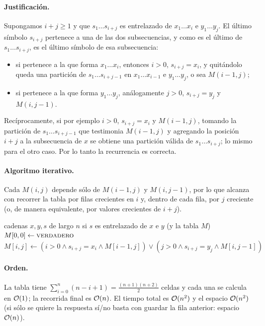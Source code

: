 \paragraph{Justificación.} Supongamos $i+j\ge 1$ y que $s_1\dots s_{i+j}$ es entrelazado de
$x_1\dots x_i$ e $y_1\dots y_j$. El último símbolo $s_{i+j}$ pertenece a una de las dos subsecuencias, y
como es el último de $s_1\dots s_{i+j}$, es el último símbolo de esa subsecuencia:
\begin{itemize}
\item si pertenece a la que forma $x_1\dots x_i$, entonces $i>0$, $s_{i+j}=x_i$, y quitándolo queda una
  partición de $s_1\dots s_{i+j-1}$ en $x_1\dots x_{i-1}$ e $y_1\dots y_j$, o sea $M(i-1,j)$;
\item si pertenece a la que forma $y_1\dots y_j$, análogamente $j>0$, $s_{i+j}=y_j$ y $M(i,j-1)$.
\end{itemize}
Recíprocamente, si por ejemplo $i>0$, $s_{i+j}=x_i$ y $M(i-1,j)$, tomando la partición de
$s_1\dots s_{i+j-1}$ que testimonia $M(i-1,j)$ y agregando la posición $i+j$ a la subsecuencia de $x$ se
obtiene una partición válida de $s_1\dots s_{i+j}$; lo mismo para el otro caso. Por lo tanto la
recurrencia es correcta.

\paragraph{Algoritmo iterativo.} Cada $M(i,j)$ depende sólo de $M(i-1,j)$ y $M(i,j-1)$, por lo que alcanza
con recorrer la tabla por filas crecientes en $i$ y, dentro de cada fila, por $j$ creciente (o, de manera
equivalente, por valores crecientes de $i+j$).

\begin{algorithm}[H]
\caption{Entrelazado$(x,y,s)$}
\begin{algorithmic}[1]
\Require cadenas $x,y,s$ de largo $n$
\Ensure \True{} si $s$ es entrelazado de $x$ e $y$ (y la tabla $M$)
\State $M[0,0] \gets \textsc{verdadero}$
      \State $M[i,j] \gets (i>0 \wedge s_{i+j}=x_i \wedge M[i-1,j]) \vee (j>0 \wedge s_{i+j}=y_j \wedge M[i,j-1])$
    \EndIf
  \EndFor
\EndFor
{}
   \Return \True \EndIf
\EndFor
\State \Return \False
\end{algorithmic}
\end{algorithm}

\paragraph{Orden.} La tabla tiene $\sum_{i=0}^n (n-i+1) = \frac{(n+1)(n+2)}{2}$ celdas y cada una se calcula
en $\mathcal{O}(1)$; la recorrida final es $\mathcal{O}(n)$. El tiempo total es $\mathcal{O}(n^2)$ y el espacio $\mathcal{O}(n^2)$ (si sólo
se quiere la respuesta sí/no basta con guardar la fila anterior: espacio $\mathcal{O}(n)$).

